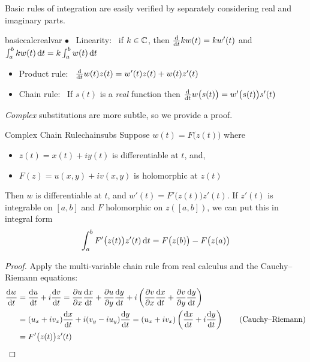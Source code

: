Basic rules of integration are easily verified by separately considering real and imaginary parts.

\begin{lemm}{}{basiccalcrealvar}
	$\bullet$ \ Linearity: \ if $k\in\C$, then $\diff tkw(t)=kw'(t)$ and $\int_a^bkw(t)\,\dt=k\int_a^bw(t)\,\dt$
	\begin{itemize}
	  \item Product rule: \ $\diff tw(t)z(t)=w'(t)z(t)+w(t)z'(t)$
	  \item Chain rule: \ If $s(t)$ is a \emph{real} function then $\diff tw\bigl(s(t)\bigr)=w'\bigl(s(t)\bigr)s'(t)$
	\end{itemize}
\end{lemm}

\goodbreak


\emph{Complex} substitutions are more subtle, so we provide a proof.

\begin{lemm}{Complex Chain Rule}{chainsubs}
	Suppose $w(t)=F\bigl(z(t)\bigr)$ where
	\begin{itemize}
	  \item $z(t)=x(t)+iy(t)$ is differentiable at $t$, and,
	  \item $F(z)=u(x,y)+iv(x,y)$ is holomorphic at $z(t)$
	\end{itemize}
	Then $w$ is differentiable at $t$, and $w'(t)=F'\bigl(z(t)\bigr)z'(t)$.\smallbreak
	If $z'(t)$ is integrable on $[a,b]$ and $F$ holomorphic on $z([a,b])$, we can put this in integral form
	\[
		\int_a^bF'\bigl(z(t)\bigr)z'(t)\,\dt %
		=F\bigl(z(b)\bigr)-F\bigl(z(a)\bigr)
	\]
\end{lemm}



\begin{proof}
	Apply the multi-variable chain rule from real calculus and the Cauchy--Riemann equations:
	\begin{align*}
		\diff[w]{t}&=\diff[u]{t}+i\diff[v]{t} = \partials[u]{x}\diff[x]{t}+\partials[u]{y}\diff[y]t
			+i\left(\partials[v]{x}\diff[x]{t}+\partials[v]{y}\diff[y]{t}\right) \\
			&=(u_x+iv_x)\diff[x]{t}+i(v_y-iu_y)\diff[y]{t} 
		= (u_x+iv_x)\left(\diff[x]{t}+i\diff[y]{t}\right) \tag{Cauchy--Riemann}\\
		&= F'\bigl(z(t)\bigr)z'(t) \tag*{\qedhere}
	\end{align*}
\end{proof}


